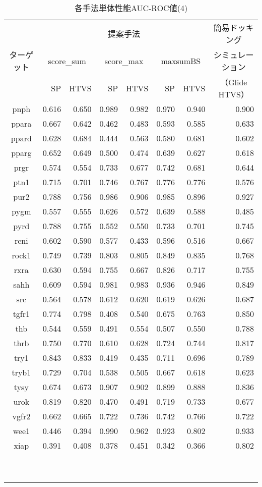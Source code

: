 \clearpage
\begin{table}[t] \centering
	\caption{各手法単体性能AUC-ROC値(4)}
	\label{table:auc:4}
	\begin{tabular}{c|rrrrrr|r}
	\hline
		&\multicolumn{6}{c|}{提案手法}&\multicolumn{1}{c}{簡易ドッキング} \\
ターゲット	&\multicolumn{2}{c}{score\_sum}&\multicolumn{2}{c}{score\_max}&\multicolumn{2}{c|}{maxsumBS}&\multicolumn{1}{c}{シミュレーション} \\
		&SP&HTVS&SP&HTVS&SP&HTVS&\multicolumn{1}{c}{（Glide HTVS）} \\
\hline
pnph&0.616&0.650&0.989&0.982&0.970&0.940&0.900 \\
ppara&0.667&0.642&0.462&0.483&0.593&0.585&0.633 \\
ppard&0.628&0.684&0.444&0.563&0.580&0.681&0.602 \\
pparg&0.652&0.649&0.500&0.474&0.639&0.627&0.618 \\
prgr&0.574&0.554&0.733&0.677&0.742&0.681&0.644 \\
ptn1&0.715&0.701&0.746&0.767&0.776&0.776&0.576 \\
pur2&0.788&0.756&0.986&0.906&0.985&0.896&0.927 \\
pygm&0.557&0.555&0.626&0.572&0.639&0.588&0.485 \\
pyrd&0.788&0.755&0.552&0.550&0.733&0.701&0.745 \\
reni&0.602&0.590&0.577&0.433&0.596&0.516&0.667 \\
rock1&0.749&0.739&0.803&0.805&0.849&0.835&0.768 \\
rxra&0.630&0.594&0.755&0.667&0.826&0.717&0.755 \\
sahh&0.609&0.594&0.981&0.983&0.936&0.946&0.849 \\
src&0.564&0.578&0.612&0.620&0.619&0.626&0.687 \\
tgfr1&0.774&0.798&0.408&0.540&0.675&0.763&0.850 \\
thb&0.544&0.559&0.491&0.554&0.507&0.550&0.788 \\
thrb&0.750&0.770&0.610&0.628&0.724&0.744&0.817 \\
try1&0.843&0.833&0.419&0.435&0.711&0.696&0.789 \\
tryb1&0.729&0.704&0.538&0.505&0.667&0.618&0.623 \\
tysy&0.674&0.673&0.907&0.902&0.899&0.888&0.836 \\
urok&0.819&0.820&0.470&0.491&0.719&0.733&0.677 \\
vgfr2&0.662&0.665&0.722&0.736&0.742&0.766&0.722 \\
wee1&0.446&0.394&0.990&0.962&0.923&0.802&0.933 \\
xiap&0.391&0.408&0.378&0.451&0.342&0.366&0.802 \\
\hline
\multicolumn{8}{c}{\ } \\
\multicolumn{8}{c}{\ } \\
	\end{tabular}
\end{table}